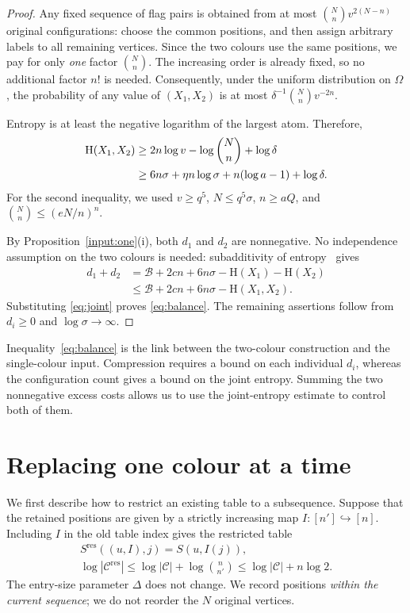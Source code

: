 \documentclass[11pt]{article}
\theoremstyle{definition}
\theoremstyle{remark}
\newcommand{\HH}{\mathrm H}
\newcommand{\CC}{\mathcal C}
\newcommand{\BB}{\mathcal B}
\begin{document}
\begin{proof}
Any fixed sequence of flag pairs is obtained from at most
$\binom Nn v^{2(N-n)}$ original configurations: choose the common
positions, and then assign arbitrary labels to all remaining vertices.
Since the two colours use the same positions, we pay for only
\emph{one} factor $\binom Nn$. The increasing order is already fixed,
so no additional factor $n!$ is needed. Consequently, under the uniform
distribution on $\Omega$, the probability of any value of $(X_1,X_2)$
is at most $\delta^{-1}\binom Nn v^{-2n}$.

Entropy is at least the negative logarithm of the largest atom.
Therefore,
\begin{align}
 \HH(X_1,X_2)
 &\ge2n\log v-\log\binom Nn+\log\delta\notag\\
 &\ge6n\sigma+\eta n\log\sigma
       +n(\log a-1)+\log\delta.
 \label{eq:joint}
\end{align}
For the second inequality, we used $v\ge q^5$, $N\le q^5\sigma$,
$n\ge aQ$, and $\binom Nn\le(eN/n)^n$.

By Proposition~\ref{input:one}\textup{(i)}, both $d_1$ and $d_2$ are
nonnegative. No independence assumption on the two colours is needed:
subadditivity of entropy~\cite[Theorem~2.6.6]{CT} gives
\begin{align*}
 d_1+d_2
 &=\BB+2cn+6n\sigma-\HH(X_1)-\HH(X_2)\\
 &\le\BB+2cn+6n\sigma-\HH(X_1,X_2).
\end{align*}
Substituting \eqref{eq:joint} proves \eqref{eq:balance}. The remaining
assertions follow from $d_i\ge0$ and $\log\sigma\to\infty$.
\end{proof}

Inequality~\eqref{eq:balance} is the link between the two-colour
construction and the single-colour input. Compression requires a bound
on each individual $d_i$, whereas the configuration count gives a bound
on the joint entropy. Summing the two nonnegative excess costs allows
us to use the joint-entropy estimate to control both of them.

\section{Replacing one colour at a time}\label{sec:replacement}

We first describe how to restrict an existing table to a subsequence.
Suppose that the retained positions are given by a strictly increasing
map $I:[n']\hookrightarrow[n]$. Including $I$ in the old table index
gives the restricted table
\begin{equation}\label{eq:restrict-table}
 \begin{gathered}
 S^{\mathrm{res}}((u,I),j)=S(u,I(j)),\\
 \log|\CC^{\mathrm{res}}|
 \le\log|\CC|+\log\binom n{n'}
 \le\log|\CC|+n\log2.
 \end{gathered}
\end{equation}
The entry-size parameter $\Delta$ does not change. We record positions
\emph{within the current sequence}; we do not reorder the $N$ original
vertices.
\end{document}
